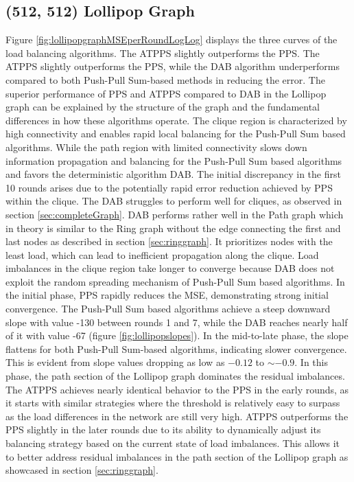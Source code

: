 \subsection{(512, 512) Lollipop Graph}
Figure \ref{fig:lollipopgraphMSEperRoundLogLog} displays the three curves of the load balancing algorithms. The ATPPS slightly outperforms the PPS. The ATPPS slightly outperforms the PPS, while the DAB algorithm underperforms compared to both Push-Pull Sum-based methods in reducing the error. The superior performance of PPS and ATPPS compared to DAB in the Lollipop graph can be explained by the structure of the graph and the fundamental differences in how these algorithms operate. The clique region is characterized by high connectivity and enables rapid local balancing for the Push-Pull Sum based algorithms. While the path region with limited connectivity slows down information propagation and balancing for the Push-Pull Sum based algorithms and favors the deterministic algorithm DAB. The initial discrepancy in the first 10 rounds arises due to the potentially rapid error reduction achieved by PPS within the clique. The DAB struggles to perform well for cliques, as observed in section \ref{sec:completeGraph}. DAB performs rather well in the Path graph which in theory is similar to the Ring graph without the edge connecting the first and last nodes as described in section \ref{sec:ringgraph}. It prioritizes nodes with the least load, which can lead to inefficient propagation along the clique. Load imbalances in the clique region take longer to converge because DAB does not exploit the random spreading mechanism of Push-Pull Sum based algorithms. In the initial phase, PPS rapidly reduces the MSE, demonstrating strong initial convergence. The Push-Pull Sum based algorithms achieve a steep downward slope with value -130 between rounds 1 and 7, while the DAB reaches nearly half of it with value -67 (figure \ref{fig:lollipopslopes}). In the mid-to-late phase, the slope flattens for both Push-Pull Sum-based algorithms, indicating slower convergence. This is evident from slope values dropping as low as $-0.12$ to $\sim-0.9$. In this phase, the path section of the Lollipop graph dominates the residual imbalances. The ATPPS achieves nearly identical behavior to the PPS in the early rounds, as it starts with similar strategies where the threshold is relatively easy to surpass as the load differences in the network are still very high. ATPPS outperforms the PPS slightly in the later rounds due to its ability to dynamically adjust its balancing strategy based on the current state of load imbalances. This allows it to better address residual imbalances in the path section of the Lollipop graph as showcased in section \ref{sec:ringgraph}.

